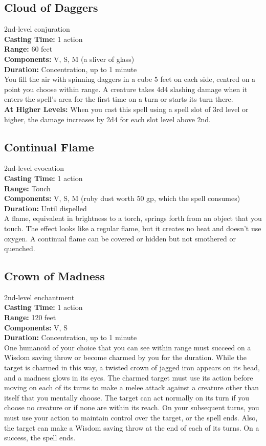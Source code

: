 \documentclass[11pt, A4paper, english]{article}
\begin{document}
		\subsection{Cloud of Daggers}
2nd-level conjuration \\
\textbf{Casting Time:} 1 action \\
\textbf{Range:} 60 feet \\
\textbf{Components:} V, S, M (a sliver of glass) \\
\textbf{Duration:} Concentration, up to 1 minute \\
You fill the air with spinning daggers in a cube 5 feet on each side, centred on a point you choose within range. A creature takes 4d4 slashing damage when it enters the spell’s area for the first time on a turn or starts its turn there. \\
\textbf{At Higher Levels:} When you cast this spell using a spell slot of 3rd level or higher, the damage increases by 2d4 for each slot level above 2nd.

		\subsection{Continual Flame}
2nd-level evocation \\
\textbf{Casting Time:} 1 action \\
\textbf{Range:} Touch \\
\textbf{Components:} V, S, M (ruby dust worth 50 gp, which the spell consumes) \\
\textbf{Duration:} Until dispelled \\
A flame, equivalent in brightness to a torch, springs forth from an object that you touch. The effect looks like a regular flame, but it creates no heat and doesn’t use oxygen. A continual flame can be covered or hidden but not smothered or quenched.

		\subsection{Crown of Madness}
2nd-level enchantment \\
\textbf{Casting Time:} 1 action \\
\textbf{Range:} 120 feet \\
\textbf{Components:} V, S \\
\textbf{Duration:} Concentration, up to 1 minute \\
One humanoid of your choice that you can see within range must succeed on a Wisdom saving throw or become charmed by you for the duration. While the target is charmed in this way, a twisted crown of jagged iron appears on its head, and a madness glows in its eyes. The charmed target must use its action before moving on each of its turns to make a melee attack against a creature other than itself that you mentally choose. The target can act normally on its turn if you choose no creature or if none are within its reach. On your subsequent turns, you must use your action to maintain control over the target, or the spell ends. Also, the target can make a Wisdom saving throw at the end of each of its turns. On a success, the spell ends.
\end{document}
